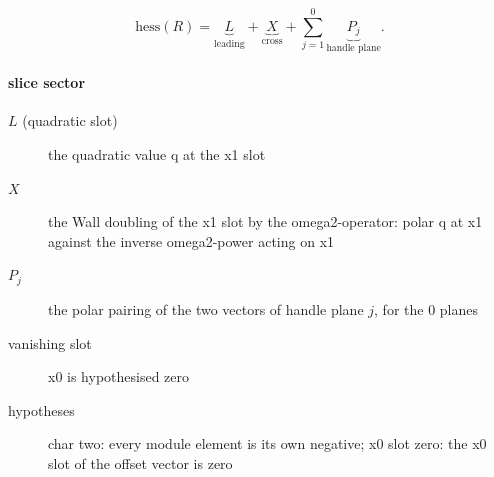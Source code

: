 \[\mathrm{hess}(R)=\underbrace{L}_{\text{leading}}+\underbrace{X}_{\text{cross}}+\sum_{j=1}^{0}\underbrace{P_j}_{\text{handle plane}}.\]
\paragraph{slice sector}
\begin{description}
\item[$L$ (quadratic slot)] the quadratic value q at the x1 slot
\item[$X$] the Wall doubling of the x1 slot by the omega2-operator: polar q at x1 against the inverse omega2-power acting on x1
\item[$P_j$] the polar pairing of the two vectors of handle plane $j$, for the 0 planes
\item[vanishing slot] x0 is hypothesised zero
\item[hypotheses] char two: every module element is its own negative; x0 slot zero: the x0 slot of the offset vector is zero
\end{description}
